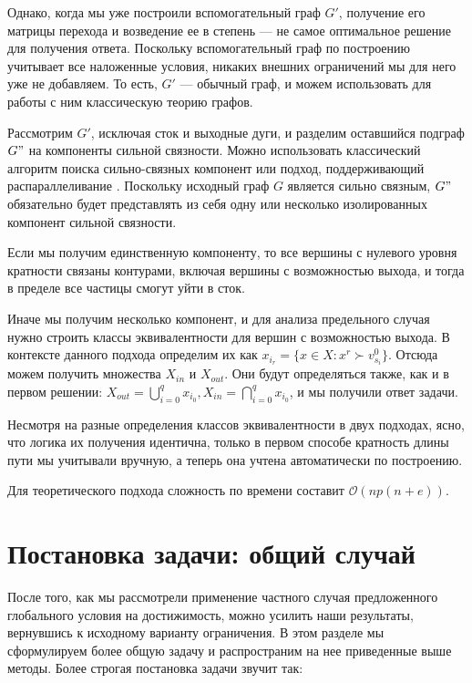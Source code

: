 Однако, когда мы уже построили вспомогательный граф $G'$, получение его матрицы перехода и возведение ее в степень --- не самое оптимальное решение для получения ответа. Поскольку вспомогательный граф по построению учитывает все наложенные условия, никаких внешних ограничений мы для него уже не добавляем. То есть, $G'$ --- обычный граф, и можем использовать для работы с ним классическую теорию графов. 

Рассмотрим $G'$, исключая сток и выходные дуги, и разделим оставшийся подграф $G"$ на компоненты сильной связности. Можно использовать классический алгоритм поиска сильно-связных компонент \cite{Tar} или подход, поддерживающий распараллеливание \cite{Par2}.
Поскольку исходный граф $G$ является сильно связным, $G"$ обязательно будет представлять из себя одну или несколько изолированных компонент сильной связности. %

Если мы получим единственную компоненту, то все вершины с нулевого уровня кратности связаны контурами, включая вершины с возможностью выхода, и тогда в пределе все частицы смогут уйти в сток. 

Иначе мы получим несколько компонент, и для анализа предельного случая нужно строить классы эквивалентности для вершин с возможностью выхода. В контексте данного подхода определим их как $x_{i_r} = \{x \in X: x^r \succ v^0_{s_i} \}$. Отсюда можем получить множества $X_{in}$ и $X_{out}$. Они будут определяться также, как и в первом решении: $X_{out} = \bigcup_{i=0}^q x_{i_0}, X_{in} = \bigcap_{i=0}^q x_{i_0}$, и мы получили ответ задачи. 

Несмотря на разные определения классов эквивалентности в двух подходах, ясно, что логика их получения идентична, только в первом способе кратность длины пути мы учитывали вручную, а теперь она учтена автоматически по построению. 

Для теоретического подхода сложность по времени составит  $\mathcal{O}(np(n + e))$.


\section{Постановка задачи: общий случай}

После того, как мы рассмотрели применение частного случая предложенного глобального условия на достижимость, можно усилить наши результаты, вернувшись к исходному варианту ограничения. В этом разделе мы сформулируем более общую задачу и распространим на нее приведенные выше методы. Более строгая постановка задачи звучит так: 	


